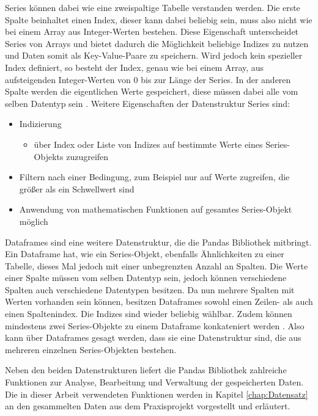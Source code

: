 Series können dabei wie eine zweispaltige Tabelle verstanden werden. Die erste Spalte beinhaltet einen Index, dieser kann
dabei beliebig sein, muss also nicht wie bei einem Array aus Integer-Werten bestehen. Diese Eigenschaft unterscheidet Series von Arrays
und bietet dadurch die Möglichkeit beliebige Indizes zu nutzen und Daten somit als Key-Value-Paare zu speichern. Wird jedoch kein spezieller Index definiert,
so besteht der Index, genau wie bei einem Array, aus aufsteigenden Integer-Werten von 0 bis zur Länge der Series. In der anderen Spalte
werden die eigentlichen Werte gespeichert, diese müssen dabei alle vom selben Datentyp sein \cite[vgl. S.254f.]{NumerischesPython}. 
Weitere Eigenschaften der Datenstruktur Series sind:
\begin{itemize}
    \item Indizierung \cite[vgl. S.256]{NumerischesPython}
    \begin{itemize}
        \item über Index oder Liste von Indizes auf bestimmte Werte eines Series-Objekts zuzugreifen
    \end{itemize}
    \item Filtern nach einer Bedingung, zum Beispiel nur auf Werte zugreifen, die größer als ein Schwellwert sind \cite[vgl. S.256]{NumerischesPython}
    \item Anwendung von mathematischen Funktionen auf gesamtes Series-Objekt möglich \cite[vgl. S.256]{NumerischesPython}
\end{itemize}

Dataframes sind eine weitere Datenstruktur, die die Pandas Bibliothek mitbringt. Ein Dataframe hat, wie ein Series-Objekt, ebenfalls Ähnlichkeiten zu einer Tabelle,
dieses Mal jedoch mit einer unbegrenzten Anzahl an Spalten. Die Werte einer Spalte müssen vom selben Datentyp sein, jedoch können verschiedene Spalten 
auch verschiedene Datentypen besitzen. Da nun mehrere Spalten mit Werten vorhanden sein können, besitzen Dataframes sowohl einen Zeilen- als auch einen
Spaltenindex. Die Indizes sind wieder beliebig wählbar. Zudem können mindestens zwei Series-Objekte zu einem Dataframe
konkateniert werden \cite[vgl. S.263f.]{NumerischesPython}. Also kann über Dataframes gesagt werden, dass sie eine Datenstruktur sind, die aus mehreren einzelnen Series-Objekten bestehen.

Neben den beiden Datenstrukturen liefert die Pandas Bibliothek zahlreiche Funktionen zur Analyse, Bearbeitung und Verwaltung der gespeicherten Daten. Die in dieser Arbeit 
verwendeten Funktionen werden in Kapitel \ref*{chap:Datensatz} an den gesammelten Daten aus dem Praxisprojekt vorgestellt und erläutert.


